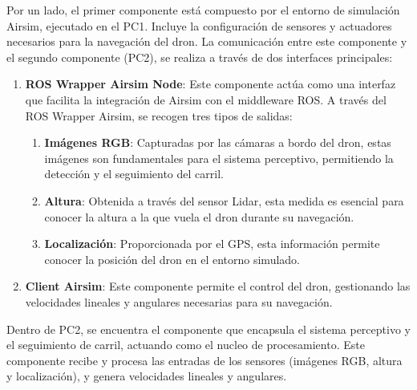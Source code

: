 Por un lado, el primer componente está compuesto por el entorno de simulación Airsim, ejecutado en el PC1. Incluye la configuración de sensores y actuadores necesarios 
para la navegación del dron. La comunicación entre este componente y el segundo componente (PC2), se realiza a través de dos interfaces principales: 

\begin{enumerate}
  \item \textbf{ROS Wrapper Airsim Node}: Este componente actúa como una interfaz que facilita la integración de Airsim con el middleware ROS. A través del ROS Wrapper Airsim, 
  se recogen tres tipos de salidas: 
    \begin{enumerate}
      \item \textbf{Imágenes RGB}: Capturadas por las cámaras a bordo del dron, estas imágenes son fundamentales para el sistema perceptivo, permitiendo la detección y el 
      seguimiento del carril.
      \item \textbf{Altura}: Obtenida a través del sensor Lidar, esta medida es esencial para conocer la altura a la que vuela el dron durante su navegación. 
      \item \textbf{Localización}: Proporcionada por el GPS, esta información permite conocer la posición del dron en el entorno simulado. 
    \end{enumerate}

  \item \textbf{Client Airsim}: Este componente permite el control del dron, gestionando las velocidades lineales y angulares necesarias para su navegación. 
\end{enumerate}

Dentro de PC2, se encuentra el componente que encapsula el sistema perceptivo y el seguimiento de carril, actuando como el nucleo de 
procesamiento. Este componente recibe y procesa las entradas de los sensores (imágenes RGB, altura y localización), y genera velocidades lineales y angulares.

